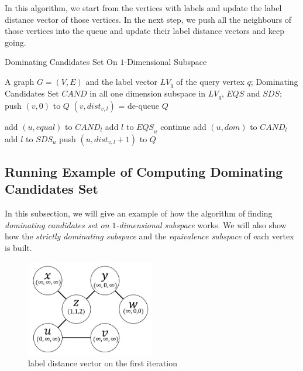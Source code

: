 In this algorithm, we start from the vertices with labels and update the label distance vector of those vertices. In the next step, we push all the neighbours of those vertices into the queue and update their label distance vectors and keep going. 
\begin{algorithm}[h]
  \caption{Dominating Candidates Set On $1$-Dimensional Subspace}
  \label{algo:dom_cand_graph}
  \begin{algorithmic}[1]
  \show\LOOP
    \REQUIRE A graph $G=(V,E)$ and the label vector $LV_q$ of the query vertex $q$;
    \ENSURE Dominating Candidates Set $\mathit{CAND}$ in all one dimension subspace in $LV_q$, $\mathit{EQS}$ and $\mathit{SDS}$;
            \STATE push $\left(v, 0\right)$ to $Q$
        \ENDFOR
    \ENDFOR
            \STATE $\left(v, dist_{v,l}\right)$ = de-queue $Q$
            
                \STATE add $\left(u, equal\right)$ to $\mathit{CAND}_l$
                \STATE add $l$ to $\mathit{EQS}_u$
                \STATE continue
            \ENDIF
            \STATE add $\left(u, dom\right)$ to $\mathit{CAND}_l$
            \STATE add $l$ to $\mathit{SDS}_u$
                \STATE push $\left(u, dist_{v,l}+1\right)$ to $Q$
            \ENDFOR
        \ENDFOR
    \ENDWHILE
  \end{algorithmic}
\end{algorithm}

\subsection{Running Example of Computing Dominating Candidates Set}

In this subsection, we will give an example of how the algorithm of finding \emph{dominating candidates set on $1$-dimensional subspace} works. We will also show how the \emph{strictly dominating subspace} and the \emph{equivalence subspace} of each vertex is built.

\begin{figure}[H]
    \centering
    \includegraphics[width=0.5\textwidth]{figs/graph_example_1}
    \caption{\label{fig:cand_step1}label distance vector on the first iteration}
    
\end{figure}

